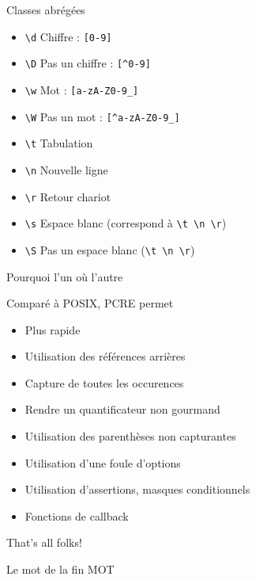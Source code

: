 \begin{frame}[containsverbatim]{\ftitle}
\def\blocktitle{Classes abrégées}
\begin{block}{\blocktitle}
\begin{itemize}
\item \verb!\d! 	Chiffre : \verb![0-9]!
\item \verb!\D! 	Pas un chiffre : \verb![^0-9]!
\item \verb!\w! 	Mot : \verb![a-zA-Z0-9_]!
\item \verb!\W! 	Pas un mot : \verb![^a-zA-Z0-9_]!
\item \verb!\t! 	Tabulation
\item \verb!\n! 	Nouvelle ligne
\item \verb!\r! 	Retour chariot
\item \verb!\s! 	Espace blanc (correspond à \verb!\t \n \r!)
\item \verb!\S! 	Pas un espace blanc (\verb!\t \n \r!)
\end{itemize}
\end{block}
\end{frame}


\def\ftitle{Pourquoi l'un où l'autre}
\begin{frame}[containsverbatim]{\ftitle}
\def\blocktitle{Comparé à POSIX, PCRE permet}
\begin{block}{\blocktitle}
\begin{itemize}
\item     Plus rapide
\item     Utilisation des références arrières
\item     Capture de toutes les occurences
\item     Rendre un quantificateur non gourmand
\item     Utilisation des parenthèses non capturantes
\item     Utilisation d'une foule d'options
\item     Utilisation d'assertions, masques conditionnels
\item     Fonctions de callback
\end{itemize}
\end{block}

\end{frame}


\def\ftitle{That's all folks!}
\begin{frame}[containsverbatim]{\ftitle}
\def\blocktitle{Le mot de la fin}
\begin{block}{\blocktitle}
MOT
\end{block}
\end{frame}


